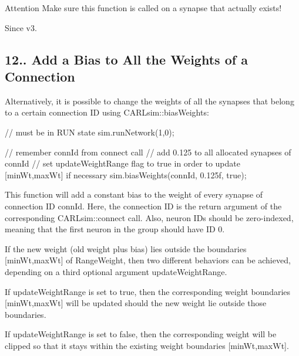 \begin{DoxyAttention}{Attention}
Make sure this function is called on a synapse that actually exists! 
\end{DoxyAttention}
\begin{DoxySince}{Since}
v3.
\end{DoxySince}
\hypertarget{ch12_advanced_topics_ch12s4s3_bias_weights}{}\subsection{12.. Add a Bias to All the Weights of a Connection}\label{ch12_advanced_topics_ch12s4s3_bias_weights}
Alternatively, it is possible to change the weights of all the synapses that belong to a certain connection ID using C\+A\+R\+Lsim\+::bias\+Weights\+: 
\begin{DoxyCode}
\textcolor{comment}{// must be in RUN state}
sim.runNetwork(1,0);

\textcolor{comment}{// remember connId from connect call}
\textcolor{comment}{// add 0.125 to all allocated synapses of connId}
\textcolor{comment}{// set updateWeightRange flag to true in order to update [minWt,maxWt] if necessary}
sim.biasWeights(connId, 0.125f, \textcolor{keyword}{true});
\end{DoxyCode}
 This function will add a constant {\ttfamily bias} to the weight of every synapse of connection ID {\ttfamily conn\+Id}. Here, the connection ID is the return argument of the corresponding C\+A\+R\+Lsim\+::connect call. Also, neuron I\+Ds should be zero-\/indexed, meaning that the first neuron in the group should have ID 0.

If the new weight (old weight plus bias) lies outside the boundaries {\ttfamily \mbox{[}min\+Wt,max\+Wt\mbox{]}} of Range\+Weight, then two different behaviors can be achieved, depending on a third optional argument {\ttfamily update\+Weight\+Range}.
\begin{DoxyItemize}
\item If {\ttfamily update\+Weight\+Range} is set to {\ttfamily true}, then the corresponding weight boundaries {\ttfamily \mbox{[}min\+Wt,max\+Wt\mbox{]}} will be updated should the new weight lie outside those boundaries.
\item If {\ttfamily update\+Weight\+Range} is set to {\ttfamily false}, then the corresponding weight will be clipped so that it stays within the existing weight boundaries {\ttfamily \mbox{[}min\+Wt,max\+Wt\mbox{]}}.
\end{DoxyItemize}

